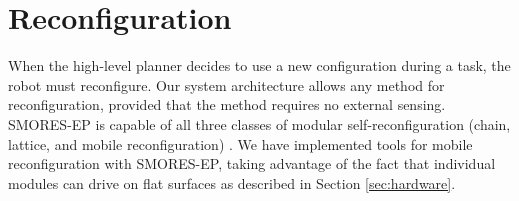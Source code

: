 \documentclass[12pt]{article}
\begin{document}

\section{Reconfiguration}
\label{sec:reconfiguration-supplement}
%
When the high-level planner decides to use a new configuration during a task, the robot must reconfigure. Our system architecture allows any method for reconfiguration, provided that the method requires no external sensing. SMORES-EP is capable of all three classes of modular self-reconfiguration (chain, lattice, and mobile reconfiguration) \cite{Davey2012,yim2003modular}.  We have implemented tools for mobile reconfiguration with SMORES-EP, taking advantage of the fact that individual modules can drive on flat surfaces as described in Section \ref{sec:hardware}.
\end{document}
